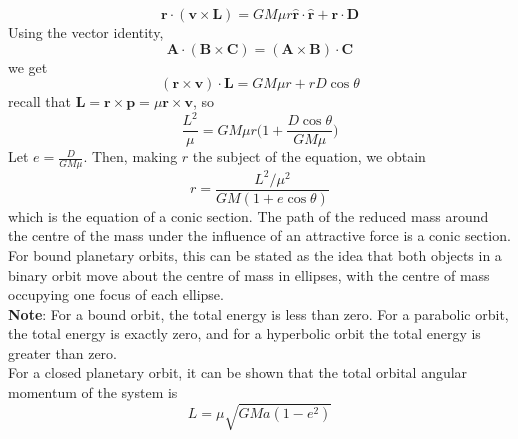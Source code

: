 \documentclass{article}
\begin{document}
$$\textbf{r}\cdot(\textbf{v}\times\textbf{L})=GM\mu r\bm{\hat{r}}\cdot\bm{\hat{r}}+\textbf{r}\cdot\textbf{D}$$
Using the vector identity,
$$\textbf{A}\cdot(\textbf{B}\times\textbf{C})=(\textbf{A}\times\textbf{B})\cdot\textbf{C}$$
we get 
$$(\textbf{r}\times\textbf{v})\cdot\textbf{L}=GM\mu r+rD\cos{\theta}$$
recall that $\textbf{L}=\textbf{r}\times\textbf{p}=\mu \textbf{r}\times\textbf{v}$, so
$$\frac{L^2}{\mu}=GM\mu r\Bigg(1+\frac{D\cos{\theta}}{GM\mu}\Bigg)$$
Let $e=\frac{D}{GM\mu}$. Then, making $r$ the subject of the equation, we obtain
$$r=\frac{L^2/\mu ^2}{GM(1+e\cos{\theta})}$$
which is the equation of a conic section. The path of the reduced mass around the centre of the mass under the influence of an attractive force is a conic section. For bound planetary orbits, this can be stated as the idea that both objects in a binary orbit move about the centre of mass in ellipses, with the centre of mass occupying one focus of each ellipse.
\\
\textbf{Note}: For a bound orbit, the total energy is less than zero. For a parabolic orbit, the total energy is exactly zero, and for a hyperbolic orbit the total energy is greater than zero.
\\
For a closed planetary orbit, it can be shown that the total orbital angular momentum of the system is 
$$L=\mu \sqrt{GMa(1-e^2)}$$
\\
\\
\\
\\
\\
\\
\\
\\
\\
\\
\\
\\
\\
\\
\\
\\
\\
\\
\end{document}
